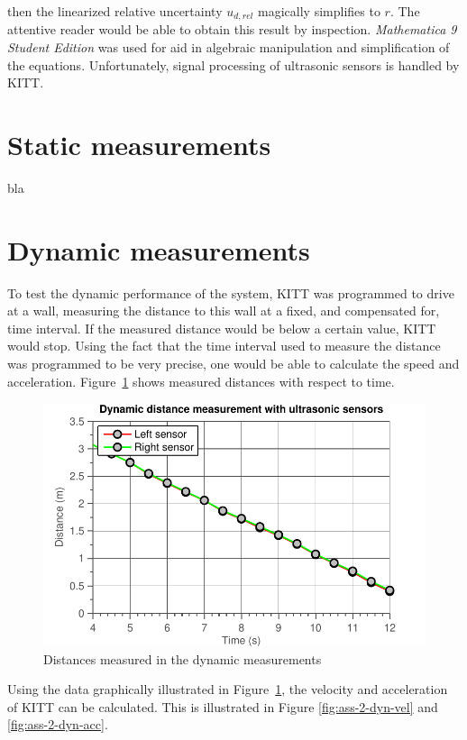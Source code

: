 \documentclass[11pt,titlepage]{report}
\begin{document}
then the linearized relative uncertainty $u_{d,rel}$ magically simplifies to $r$. The attentive reader would be able to obtain this result by inspection. \textit{Mathematica 9 Student Edition} was used for aid in algebraic manipulation and simplification of the equations. Unfortunately, signal processing of ultrasonic sensors is handled by KITT.

\section{Static measurements}
bla

\section{Dynamic measurements}
To test the dynamic performance of the system, KITT was programmed to drive at a wall, measuring the distance to this wall at a fixed, and compensated for, time interval. If the measured distance would be below a certain value, KITT would stop. Using the fact that the time interval used to measure the distance was programmed to be very precise, one would be able to calculate the speed and acceleration. Figure~\ref{fig:ass-2-dyn-dist} shows measured distances with respect to time.

\begin{figure}[H]
	\begin{center}
		\includegraphics[width=0.6\linewidth]{resource/distance-rc.pdf}
	\end{center}
	\caption{Distances measured in the dynamic measurements}
	\label{fig:ass-2-dyn-dist}
\end{figure}

Using the data graphically illustrated in Figure~\ref{fig:ass-2-dyn-dist}, the velocity and acceleration of KITT can be calculated. This is illustrated in Figure \ref{fig:ass-2-dyn-vel} and \ref{fig:ass-2-dyn-acc}.
\end{document}
